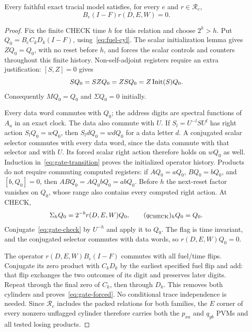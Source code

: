 \begin{lemma}\label{lem:gate-testing}
Every faithful exact tracial model satisfies, for every $e$ and $r\in\mathcal R_e$,
\begin{equation}\label{eq:gate-forced}
 B_e(I-F)r(D,E,W)=0.
\end{equation}
\end{lemma}
\begin{proof}
Fix the finite CHECK time $h$ for this relation and choose $2^k>h$. Put $Q_0=B_eC_kD_k(I-F)$, using~\eqref{eq:fuel-cyl}. The scalar initialization lemma gives $ZQ_0=Q_0$, with no reset before $h$, and forces the scalar controls and counters throughout this finite history. Non-self-adjoint registers require an extra justification: $[S,Z]=0$ gives
\[
 SQ_0=SZQ_0=ZS Q_0=Z\operatorname{Init}(S)Q_0.
\]
Consequently $MQ_0=Q_0$ and $\Sigma Q_0=0$ initially.

Every data word commutes with $Q_0$; the address digits are spectral functions of $A_a$ in an exact clock. The data also commute with $U$. If $S_l=U^{-l}SU^l$ has right action $S_lQ_0=wQ_0$, then $S_ldQ_0=wdQ_0$ for a data letter $d$. A conjugated scalar selector commutes with every data word, since the data commute with that selector and with $U$. Its forced scalar right action therefore holds on $wQ_0$ as well. Induction in~\eqref{eq:gate-transition} proves the initialized operator history. Products do not require commuting computed registers: if $AQ_0=aQ_0$, $BQ_0=bQ_0$, and $[b,Q_0]=0$, then $ABQ_0=AQ_0bQ_0=abQ_0$. Before $h$ the next-reset factor vanishes on $Q_0$, whose range also contains every computed right action. At CHECK,
\[
 \Sigma_hQ_0=2^{-b}r(D,E,W)Q_0,\qquad (q_{\rm CHECK})_hQ_0=Q_0.
\]
Conjugate~\eqref{eq:gate-check} by $U^{-h}$ and apply it to $Q_0$. The flag is time invariant, and the conjugated selector commutes with data words, so $r(D,E,W)Q_0=0$.

The operator $r(D,E,W)B_e(I-F)$ commutes with all fuel/time flips. Conjugate its zero product with $C_kD_k$ by the earliest specified fuel flip and add: that flip exchanges the two outcomes of its digit and preserves later digits. Repeat through the final zero of $C_k$, then through $D_k$. This removes both cylinders and proves~\eqref{eq:gate-forced}. No conditional trace independence is needed. Since $\mathcal R_e$ includes the packed relations for both families, the $E$ corner of every nonzero unflagged cylinder therefore carries both the $p_{xa}$ and $q_{yb}$ PVMs and all tested losing products.
\end{proof}

